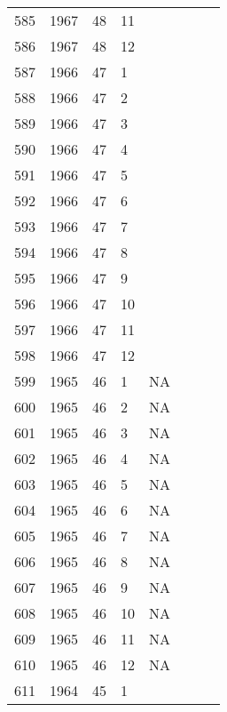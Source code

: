 \begin{longtable}{ |l|l|l|l|l|l|l|l| }
585 & 1967 & 48 &    11 &         &                &  & \\
586 & 1967 & 48 &    12 &         &                &  & \\
587 & 1966 & 47 &     1 &         &                &  & \\
588 & 1966 & 47 &     2 &         &                &  & \\
589 & 1966 & 47 &     3 &         &                &  & \\
590 & 1966 & 47 &     4 &         &                &  & \\
591 & 1966 & 47 &     5 &         &                &  & \\
592 & 1966 & 47 &     6 &         &                &  & \\
593 & 1966 & 47 &     7 &         &                &  & \\
594 & 1966 & 47 &     8 &         &                &  & \\
595 & 1966 & 47 &     9 &         &                &  & \\
596 & 1966 & 47 &    10 &         &                &  & \\
597 & 1966 & 47 &    11 &         &                &  & \\
598 & 1966 & 47 &    12 &         &                &  & \\
599 & 1965 & 46 &     1 &      NA &                &  & \\
600 & 1965 & 46 &     2 &      NA &                &  & \\
601 & 1965 & 46 &     3 &      NA &                &  & \\
602 & 1965 & 46 &     4 &      NA &                &  & \\
603 & 1965 & 46 &     5 &      NA &                &  & \\
604 & 1965 & 46 &     6 &      NA &                &  & \\
605 & 1965 & 46 &     7 &      NA &                &  & \\
606 & 1965 & 46 &     8 &      NA &                &  & \\
607 & 1965 & 46 &     9 &      NA &                &  & \\
608 & 1965 & 46 &    10 &      NA &                &  & \\
609 & 1965 & 46 &    11 &      NA &                &  & \\
610 & 1965 & 46 &    12 &      NA &                &  & \\
611 & 1964 & 45 &     1 &         &                &  & \\

\end{longtable}
